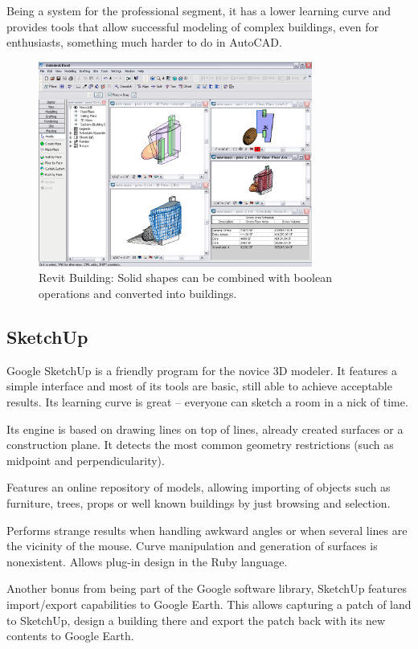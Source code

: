 Being a system for the professional segment, it has a lower learning curve and provides
tools that allow successful modeling of complex buildings, even for enthusiasts,
something much harder to do in AutoCAD.

\begin{figure}[!ht]
    \centering
    \includegraphics[width=9cm]{gfx/revit-1.png}
    \caption{Revit Building: Solid shapes can be combined with boolean operations and converted into buildings.}
    \label{FIG-REVIT}
\end{figure}

\subsection{SketchUp}
Google SketchUp \cite{SITE-SKETCHUP} is a friendly program for the novice 3D modeler.
It features a simple interface and most of its tools are basic,
still able to achieve acceptable results.
Its learning curve is great -- everyone can sketch a room in a nick of time.

Its engine is based on drawing lines on top of lines,
already created surfaces or a construction plane.
It detects the most common geometry restrictions (such as midpoint and perpendicularity).

Features an online repository of models, allowing importing of objects such as
furniture, trees, props or well known buildings by just browsing and selection.

Performs strange results when handling awkward angles or when several lines
are the vicinity of the mouse.
Curve manipulation and generation of surfaces is nonexistent.
Allows plug-in design in the Ruby language.

Another bonus from being part of the Google software library, SketchUp features import/export capabilities to Google Earth\cite{SITE-EARTH}.
This allows capturing a patch of land to SketchUp, design a building there and export the patch
back with its new contents to Google Earth.

